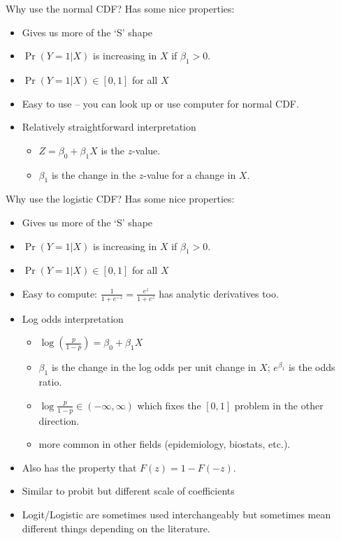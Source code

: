 \documentclass[aspectratio=169,11pt]{beamer}
\begin{document}
\begin{frame}{Why use the normal CDF?}
Has some nice properties:
\begin{itemize}
\item Gives us more of the `S' shape
\item $\Pr(Y=1|X)$ is increasing in $X$ if $\beta_1>0$.
\item $\Pr(Y=1|X) \in [0,1]$ for all $X$
\item Easy to use -- you can look up or use computer for normal CDF.
\item Relatively straightforward interpretation
\begin{itemize}
\item $Z=\beta_0 + \beta_1 X$ is the $z$-value.
\item $\beta_1$ is the change in the $z$-value for a change in $X$.
\end{itemize}
\end{itemize}
\end{frame}


\begin{frame}{Why use the logistic CDF?}
Has some nice properties:
\begin{itemize}
\item Gives us more of the `S' shape
\item $\Pr(Y=1|X)$ is increasing in $X$ if $\beta_1>0$.
\item $\Pr(Y=1|X) \in [0,1]$ for all $X$
\item Easy to compute: $\frac{1}{1+e^{-z}}=\frac{e^{z}}{1+e^{z}}$ has analytic derivatives too.
\item Log odds interpretation
\begin{itemize}
\item $\log(\frac{p}{1-p}) = \beta_0 + \beta_1 X$
\item $\beta_1$ is the change in the \alert{log odds} per unit change in $X$; $e^{\beta_1}$ is the \alert{odds ratio}.
\item $\log\frac{p}{1-p} \in (-\infty,\infty)$ which fixes the $[0,1]$ problem in the other direction.
\item more common in other fields (epidemiology, biostats, etc.).
\end{itemize}
\item Also has the property that $F(z) = 1-F(-z)$.
\item Similar to probit but different scale of coefficients
\item Logit/Logistic are sometimes used interchangeably but sometimes mean different things depending on the literature.
\end{itemize}
\end{frame}
\end{document}
